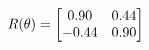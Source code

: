 \documentclass[preview]{standalone}
\begin{document}
\begin{align*}
\special{dvisvgm:raw <g id='unique000'>}R(\theta) = \begin{bmatrix}0.90 & 0.44\\-0.44 & 0.90\end{bmatrix}\special{dvisvgm:raw </g>}
\end{align*}
\end{document}
